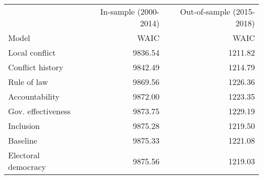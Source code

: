 \begin{longtable}{lrr}
\toprule
 & In-sample (2000-2014) & Out-of-sample (2015-2018) \\ 
\cmidrule(lr){2-2} \cmidrule(lr){3-3}
Model & WAIC & WAIC \\ 
\midrule\addlinespace[2.5pt]
Local conflict & 9836.54 & 1211.82 \\ 
Conflict history & 9842.49 & 1214.79 \\ 
Rule of law & 9869.56 & 1226.36 \\ 
Accountability & 9872.00 & 1223.35 \\ 
Gov. effectiveness & 9873.75 & 1229.19 \\ 
Inclusion & 9875.28 & 1219.50 \\ 
Baseline & 9875.33 & 1221.08 \\ 
Electoral democracy & 9875.56 & 1219.03 \\ 
\bottomrule
\end{longtable}

